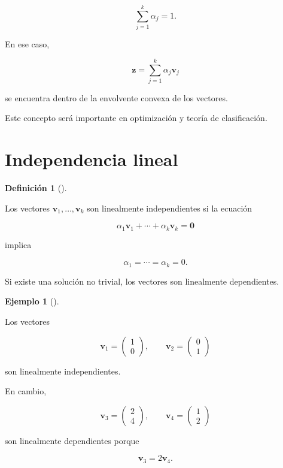 \documentclass[
  spanish,
  11pt,
  letterpaper,
  DIV=11,
  numbers=noendperiod]{scrreprt}
\theoremstyle{definition}
\newtheorem{definition}{Definición}[chapter]
\theoremstyle{plain}
\theoremstyle{definition}
\newtheorem{example}{Ejemplo}[chapter]
\theoremstyle{remark}
\begin{document}
\[
\sum_{j=1}^{k}\alpha_j=1.
\]

En ese caso,

\[
\mathbf{z}
=
\sum_{j=1}^{k}
\alpha_j\mathbf{v}_j
\]

se encuentra dentro de la envolvente convexa de los vectores.

Este concepto será importante en optimización y teoría de clasificación.

\section{Independencia lineal}\label{independencia-lineal}

\begin{definition}[]\protect\hypertarget{def-independencia-lineal}{}\label{def-independencia-lineal}

Los vectores \(\mathbf{v}_1,\ldots,\mathbf{v}_k\) son linealmente
independientes si la ecuación

\[
\alpha_1\mathbf{v}_1+\cdots+\alpha_k\mathbf{v}_k
=
\mathbf{0}
\]

implica

\[
\alpha_1=\cdots=\alpha_k=0.
\]

\end{definition}

Si existe una solución no trivial, los vectores son linealmente
dependientes.

\begin{example}[]\protect\hypertarget{exm-independencia}{}\label{exm-independencia}

Los vectores

\[
\mathbf{v}_1=
\begin{pmatrix}
1\\
0
\end{pmatrix},
\qquad
\mathbf{v}_2=
\begin{pmatrix}
0\\
1
\end{pmatrix}
\]

son linealmente independientes.

En cambio,

\[
\mathbf{v}_3=
\begin{pmatrix}
2\\
4
\end{pmatrix},
\qquad
\mathbf{v}_4=
\begin{pmatrix}
1\\
2
\end{pmatrix}
\]

son linealmente dependientes porque

\[
\mathbf{v}_3=2\mathbf{v}_4.
\]

\end{example}
\end{document}
